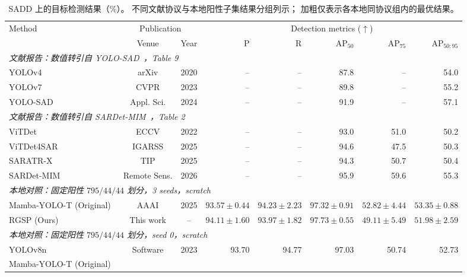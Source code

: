 \documentclass[journal]{IEEEtran}
\begin{document}
\begin{table}[!t]
\centering
\small
\setlength{\tabcolsep}{3.5pt}
\renewcommand{\arraystretch}{1.10}
\caption{SADD 上的目标检测结果（\%）。
不同文献协议与本地阳性子集结果分组列示；
加粗仅表示各本地同协议组内的最优结果。}
\label{tab:sadd_detection_comparison}
\begin{tabular*}{\textwidth}{@{\extracolsep{\fill}}lccrrrrr}
\toprule
\multirow{2}{*}{Method}
& \multicolumn{2}{c}{Publication}
& \multicolumn{5}{c}{Detection metrics ($\uparrow$)} \\
\cmidrule(lr){2-3}\cmidrule(lr){4-8}
& Venue & Year & P & R
& AP$_{50}$ & AP$_{75}$ & AP$_{50:95}$ \\
\midrule
\multicolumn{8}{l}{\textit{文献报告：数值转引自 YOLO-SAD~\cite{yolosad2024}，Table 9}} \\
YOLOv4~\cite{yolov42020}
& arXiv & 2020
& -- & -- & 87.8 & -- & 54.0 \\
YOLOv7~\cite{yolov72023}
& CVPR & 2023
& -- & -- & 89.8 & -- & 55.2 \\
YOLO-SAD~\cite{yolosad2024}
& Appl. Sci. & 2024
& -- & -- & 91.9 & -- & 57.1 \\
\midrule
\multicolumn{8}{l}{\textit{文献报告：数值转引自 SARDet-MIM~\cite{sardetmim2026}，Table 2}} \\
ViTDet~\cite{vitdet2022}
& ECCV & 2022
& -- & -- & 93.0 & 51.0 & 50.2 \\
ViTDet4SAR~\cite{vitdet4sar2025}
& IGARSS & 2025
& -- & -- & 94.6 & 47.5 & 50.3 \\
SARATR-X~\cite{saratrx2025}
& TIP & 2025
& -- & -- & 94.3 & 50.7 & 50.4 \\
SARDet-MIM~\cite{sardetmim2026}
& Remote Sens. & 2026
& -- & -- & 95.9 & 59.6 & 55.3 \\
\midrule
\multicolumn{8}{l}{\textit{本地对照：固定阳性 $795/44/44$ 划分，3 seeds，scratch}} \\
Mamba-YOLO-T (Original)~\cite{mambayolo2024}
& AAAI & 2025
& $93.57\pm0.44$ & $\mathbf{94.23\pm2.23}$ & $97.32\pm0.91$ & $\mathbf{52.82\pm4.44}$ & $\mathbf{53.35\pm0.88}$ \\
RGSP (Ours)
& This work & --
& $\mathbf{94.11\pm1.60}$ & $93.97\pm1.82$ & $\mathbf{97.73\pm0.55}$ & $49.11\pm5.49$ & $51.98\pm2.59$ \\
\midrule
\multicolumn{8}{l}{\textit{本地对照：固定阳性 $795/44/44$ 划分，seed 0，scratch}} \\
YOLOv8n~\cite{yolov82023}
& Software & 2023
& 93.70 & 94.77 & 97.03 & 50.74 & 52.73 \\
Mamba-YOLO-T (Original)~\cite{mambayolo2024}

\end{tabular*}
\end{table}
\end{document}
